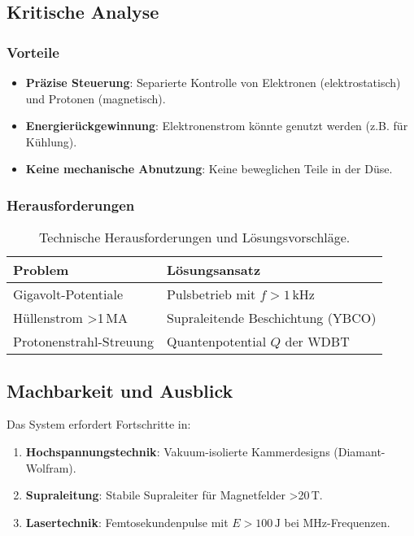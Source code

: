 \subsection{Kritische Analyse}
\subsubsection*{Vorteile}
\begin{itemize}
    \item \textbf{Präzise Steuerung}: Separierte Kontrolle von Elektronen (elektrostatisch) und Protonen (magnetisch).
    \item \textbf{Energierückgewinnung}: Elektronenstrom könnte genutzt werden (z.B. für Kühlung).
    \item \textbf{Keine mechanische Abnutzung}: Keine beweglichen Teile in der Düse.
\end{itemize}

\subsubsection*{Herausforderungen}
\begin{table}[ht]
    \centering
    \begin{tabular}{ll}
        \toprule
        \textbf{Problem} & \textbf{Lösungsansatz} \\
        \midrule
        Gigavolt-Potentiale & Pulsbetrieb mit $f > 1\,\text{kHz}$ \\
        Hüllenstrom >1\,MA & Supraleitende Beschichtung (YBCO) \\
        Protonenstrahl-Streuung & Quantenpotential $Q$ der WDBT \\
        \bottomrule
    \end{tabular}
    \caption{Technische Herausforderungen und Lösungsvorschläge.}
    \label{tab:probleme}
\end{table}

\subsection{Machbarkeit und Ausblick}
Das System erfordert Fortschritte in:
\begin{enumerate}
    \item \textbf{Hochspannungstechnik}: Vakuum-isolierte Kammerdesigns (Diamant-Wolfram).
    \item \textbf{Supraleitung}: Stabile Supraleiter für Magnetfelder >20\,T.
    \item \textbf{Lasertechnik}: Femtosekundenpulse mit $E > 100\,\text{J}$ bei MHz-Frequenzen.
\end{enumerate}

